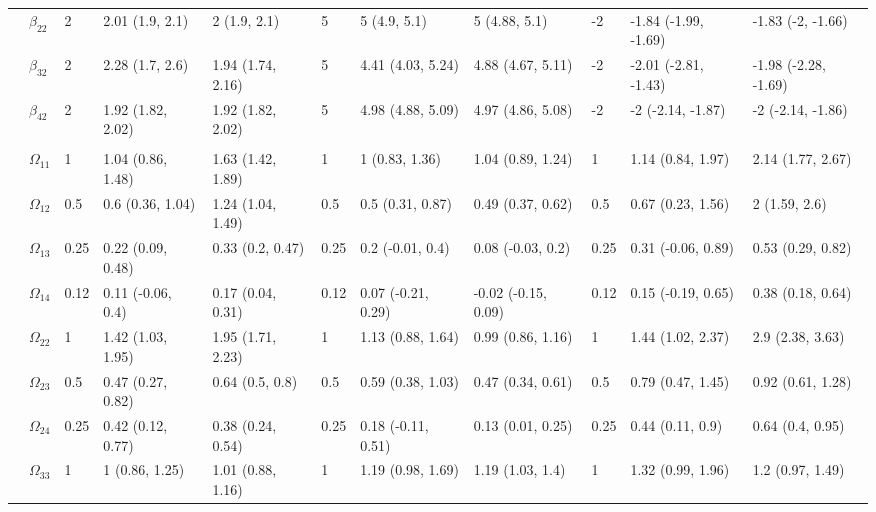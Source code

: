 \documentclass[]{article}
\begin{document}
\begin{landscape}
\begin{table}[t]
\begin{tabular}{lllllllllll}
\hspace{1em} & $\beta_{22}$ & 2 & 2.01 (1.9, 2.1) & 2 (1.9, 2.1) & 5 & 5 (4.9, 5.1) & 5 (4.88, 5.1) & -2 & -1.84 (-1.99, -1.69) & -1.83 (-2, -1.66)\\
\hspace{1em} & $\beta_{32}$ & 2 & 2.28 (1.7, 2.6) & 1.94 (1.74, 2.16) & 5 & 4.41 (4.03, 5.24) & 4.88 (4.67, 5.11) & -2 & -2.01 (-2.81, -1.43) & -1.98 (-2.28, -1.69)\\
\hspace{1em} & $\beta_{42}$ & 2 & 1.92 (1.82, 2.02) & 1.92 (1.82, 2.02) & 5 & 4.98 (4.88, 5.09) & 4.97 (4.86, 5.08) & -2 & -2 (-2.14, -1.87) & -2 (-2.14, -1.86)\\
\addlinespace[0.3em]
\multicolumn{11}{l}{\textbf{ }}\\
\hspace{1em} & $\Omega_{11}$ & 1 & 1.04 (0.86, 1.48) & 1.63 (1.42, 1.89) & 1 & 1 (0.83, 1.36) & 1.04 (0.89, 1.24) & 1 & 1.14 (0.84, 1.97) & 2.14 (1.77, 2.67)\\
\hspace{1em} & $\Omega_{12}$ & 0.5 & 0.6 (0.36, 1.04) & 1.24 (1.04, 1.49) & 0.5 & 0.5 (0.31, 0.87) & 0.49 (0.37, 0.62) & 0.5 & 0.67 (0.23, 1.56) & 2 (1.59, 2.6)\\
\hspace{1em} & $\Omega_{13}$ & 0.25 & 0.22 (0.09, 0.48) & 0.33 (0.2, 0.47) & 0.25 & 0.2 (-0.01, 0.4) & 0.08 (-0.03, 0.2) & 0.25 & 0.31 (-0.06, 0.89) & 0.53 (0.29, 0.82)\\
\hspace{1em} & $\Omega_{14}$ & 0.12 & 0.11 (-0.06, 0.4) & 0.17 (0.04, 0.31) & 0.12 & 0.07 (-0.21, 0.29) & -0.02 (-0.15, 0.09) & 0.12 & 0.15 (-0.19, 0.65) & 0.38 (0.18, 0.64)\\
\hspace{1em} & $\Omega_{22}$ & 1 & 1.42 (1.03, 1.95) & 1.95 (1.71, 2.23) & 1 & 1.13 (0.88, 1.64) & 0.99 (0.86, 1.16) & 1 & 1.44 (1.02, 2.37) & 2.9 (2.38, 3.63)\\
\hspace{1em} & $\Omega_{23}$ & 0.5 & 0.47 (0.27, 0.82) & 0.64 (0.5, 0.8) & 0.5 & 0.59 (0.38, 1.03) & 0.47 (0.34, 0.61) & 0.5 & 0.79 (0.47, 1.45) & 0.92 (0.61, 1.28)\\
\hspace{1em} & $\Omega_{24}$ & 0.25 & 0.42 (0.12, 0.77) & 0.38 (0.24, 0.54) & 0.25 & 0.18 (-0.11, 0.51) & 0.13 (0.01, 0.25) & 0.25 & 0.44 (0.11, 0.9) & 0.64 (0.4, 0.95)\\
\hspace{1em} & $\Omega_{33}$ & 1 & 1 (0.86, 1.25) & 1.01 (0.88, 1.16) & 1 & 1.19 (0.98, 1.69) & 1.19 (1.03, 1.4) & 1 & 1.32 (0.99, 1.96) & 1.2 (0.97, 1.49)\\

\end{tabular}
\end{table}
\end{landscape}
\end{document}
